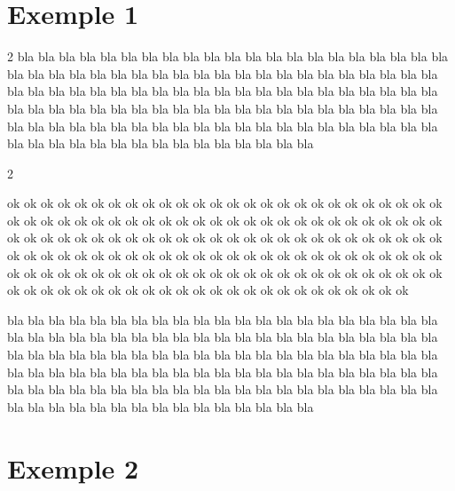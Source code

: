 \documentclass[]{article}
\newlength{\mycolumnsep}
\newlength{\mycolumnseprule}
\newlength{\mysubcolumnsep}
\newlength{\mysubcolumnseprule}
\newenvironment{submulticols}[1]{%
        \setlength{\columnsep}{\mysubcolumnsep}
        \setlength{\columnseprule}{\mysubcolumnseprule}
        \begin{multicols}{#1}
    }{%
        \end{multicols}
    }
\begin{document}
\section{Exemple 1}

\begin{multicols}{2}
    bla bla bla bla bla bla bla bla bla bla bla bla bla bla bla
    bla bla bla bla bla bla bla bla bla bla bla bla bla bla bla
    bla bla bla bla bla bla bla bla bla bla bla bla bla bla bla
    bla bla bla bla bla bla bla bla bla bla bla bla bla bla bla
    bla bla bla bla bla bla bla bla bla bla bla bla bla bla bla
    bla bla bla bla bla bla bla bla bla bla bla bla bla bla bla
    bla bla bla bla bla bla bla bla bla bla bla bla bla bla bla
    bla bla bla bla bla bla bla bla bla bla bla bla bla bla bla

    \begin{submulticols}{2}
        ok ok ok ok ok ok ok ok ok ok ok ok ok ok
        ok ok ok ok ok ok ok ok ok ok ok ok ok ok
        ok ok ok ok ok ok ok ok ok ok ok ok ok ok
        ok ok ok ok ok ok ok ok ok ok ok ok ok ok
        ok ok ok ok ok ok ok ok ok ok ok ok ok ok
        ok ok ok ok ok ok ok ok ok ok ok ok ok ok
        ok ok ok ok ok ok ok ok ok ok ok ok ok ok
        ok ok ok ok ok ok ok ok ok ok ok ok ok ok
        ok ok ok ok ok ok ok ok ok ok ok ok ok ok
        ok ok ok ok ok ok ok ok ok ok ok ok ok ok
        ok ok ok ok ok ok ok ok ok ok ok ok ok ok
    \end{submulticols}


    bla bla bla bla bla bla bla bla bla bla bla bla bla bla bla
    bla bla bla bla bla bla bla bla bla bla bla bla bla bla bla
    bla bla bla bla bla bla bla bla bla bla bla bla bla bla bla
    bla bla bla bla bla bla bla bla bla bla bla bla bla bla bla
    bla bla bla bla bla bla bla bla bla bla bla bla bla bla bla
    bla bla bla bla bla bla bla bla bla bla bla bla bla bla bla
    bla bla bla bla bla bla bla bla bla bla bla bla bla bla bla
    bla bla bla bla bla bla bla bla bla bla bla bla bla bla bla
\end{multicols}


\section{Exemple 2}
\end{document}
